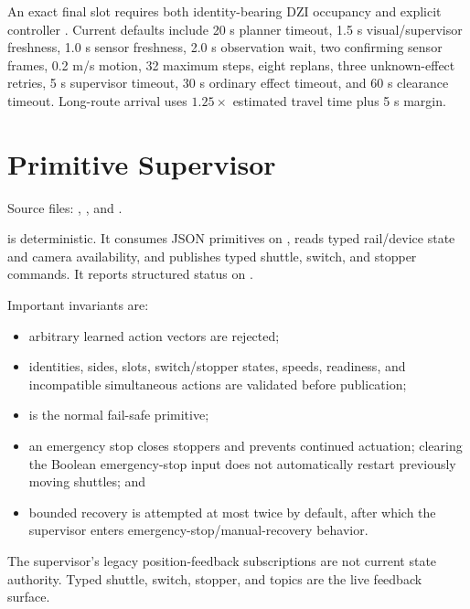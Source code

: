 An exact final slot requires both identity-bearing DZI occupancy and explicit
controller . Current defaults include 20 s planner timeout,
1.5 s visual/supervisor freshness, 1.0 s sensor freshness, 2.0 s observation
wait, two confirming sensor frames, 0.2 m/s motion, 32 maximum steps, eight
replans, three unknown-effect retries, 5 s supervisor timeout, 30 s ordinary
effect timeout, and 60 s clearance timeout. Long-route arrival uses
$1.25\times$ estimated travel time plus 5 s margin.

\section{Primitive Supervisor}

Source files: ,
, and
.

 is deterministic. It consumes JSON primitives
on , reads typed rail/device state and camera
availability, and publishes typed shuttle, switch, and stopper commands. It
reports structured status on .

Important invariants are:

\begin{itemize}
  \item arbitrary learned action vectors are rejected;
  \item identities, sides, slots, switch/stopper states, speeds, readiness, and
        incompatible simultaneous actions are validated before publication;
  \item {} is the normal fail-safe primitive;
  \item an emergency stop closes stoppers and prevents continued actuation;
        clearing the Boolean emergency-stop input does not automatically
        restart previously moving shuttles; and
  \item bounded recovery is attempted at most twice by default, after which the
        supervisor enters emergency-stop/manual-recovery behavior.
\end{itemize}

The supervisor's legacy position-feedback subscriptions are not current state
authority. Typed shuttle, switch, stopper, and  topics
are the live feedback surface.

